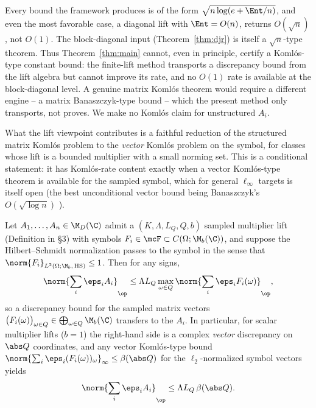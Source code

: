 \begin{remark}\label{rem:komlosceiling}
Every bound the framework produces is of the form
$\sqrt{n\log(e+\Ent/n)}$, and even the most favorable case, a diagonal lift with
$\Ent=O(n)$, returns $O(\sqrt n)$, not $O(1)$. The block-diagonal input
(Theorem~\ref{thm:djr}) is itself a $\sqrt n$-type theorem. Thus
Theorem~\ref{thm:main} cannot, even in principle, certify a Koml\'os-type constant
bound: the finite-lift method transports a discrepancy bound from the lift algebra
but cannot improve its rate, and no $O(1)$ rate is available at the block-diagonal
level. A genuine matrix Koml\'os theorem would require a different engine -- a
matrix Banaszczyk-type bound -- which the present method only transports, not
proves. We make no Koml\'os claim for unstructured $A_i$.
\end{remark}

What the lift viewpoint contributes is a faithful reduction of the structured
matrix Koml\'os problem to the \emph{vector} Koml\'os problem on the symbol, for
classes whose lift is a bounded multiplier with a small norming set. This is a
conditional statement: it has Koml\'os-rate content exactly when a vector
Koml\'os-type theorem is available for the sampled symbol, which for general
$\ell_\infty$ targets is itself open (the best unconditional vector bound being
Banaszczyk's $O(\sqrt{\log n})$ \cite{Banaszczyk}).

\begin{proposition}
\label{prop:matrixkomlos}
Let $A_1,\ldots,A_n\in\M_D(\C)$ admit a $(K,\Lambda,L_Q,Q,b)$ sampled multiplier
lift (Definition in \S3) with symbols $F_i\in\mcF\subset C(\Omega;\M_b(\C))$, and
suppose the Hilbert--Schmidt normalization passes to the symbol in the sense that
$\norm{F_i}_{L^2(\Omega;\M_b,\,\mathrm{HS})}\le1$. Then for any signs,
\[
\norm{\sum_i\eps_iA_i}_{\op}
\le\Lambda L_Q\max_{\omega\in Q}\norm{\sum_i\eps_iF_i(\omega)}_{\op},
\]
so a discrepancy bound for the sampled matrix vectors
$\big(F_i(\omega)\big)_{\omega\in Q}\in\bigoplus_{\omega\in Q}\M_b(\C)$ transfers
to the $A_i$. In particular, for scalar multiplier lifts ($b=1$) the right-hand
side is a complex \emph{vector} discrepancy on $\abs Q$ coordinates, and any
vector Koml\'os-type bound
$\norm{\sum_i\eps_i(F_i(\omega))_\omega}_\infty\le\beta(\abs Q)$ for the
$\ell_2$-normalized symbol vectors yields
\[
\norm{\sum_i\eps_iA_i}_{\op}\le\Lambda L_Q\,\beta(\abs Q).
\]
\end{proposition}

